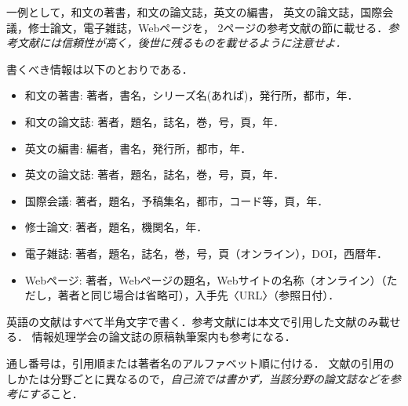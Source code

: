\documentclass[10pt,a4paper,notitlepage,oneside,twocolumn]{abst_jsarticle}
\begin{document}
一例として，和文の著書\cite{suetake}，和文の論文誌\cite{kusano}，英文の編書\cite{fuortes}，
英文の論文誌\cite{rice}，国際会議\cite{guibas}，修士論文\cite{chudai}，電子雑誌\cite{iwama}，Webページ\cite{IPSJ}を，
2ページの参考文献の節に載せる．{\em 参考文献には信頼性が高く，後世に残るものを載せるように注意せよ．}

書くべき情報は以下のとおりである．
\begin{itemize}
\item 和文の著書: 著者，書名，シリーズ名(あれば)，発行所，都市，年．
\item 和文の論文誌: 著者，題名，誌名，巻，号，頁，年．
\item 英文の編書: 編者，書名，発行所，都市，年．
\item 英文の論文誌: 著者，題名，誌名，巻，号，頁，年．
\item 国際会議: 著者，題名，予稿集名，都市，コード等，頁，年．
\item 修士論文: 著者，題名，機関名，年．
\item 電子雑誌: 著者，題名，誌名，巻，号，頁（オンライン），DOI，西暦年．
\item Webページ: 著者，Webページの題名，Webサイトの名称（オンライン）（ただし，著者と同じ場合は省略可），入手先〈URL〉（参照日付）．
\end{itemize}
英語の文献はすべて半角文字で書く．参考文献には本文で引用した文献のみ載せる．
情報処理学会の論文誌の原稿執筆案内\cite{IPSJ}も参考になる．

通し番号は，引用順または著者名のアルファベット順に付ける．
文献の引用のしかたは分野ごとに異なるので，{\em 自己流では書かず，当該分野の論文誌などを参考にする}こと．
\end{document}
